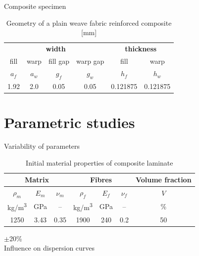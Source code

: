 \documentclass[10pt]{beamer} %
\begin{document}
\begin{frame}[t,label=frame12]{Composite specimen}
\begin{table}[h]
	\renewcommand{\arraystretch}{1.1}
	\centering \footnotesize
	\caption{Geometry of a plain weave fabric reinforced composite [mm]}
	\begin{tabular}{cccccc} 
		\toprule
		\multicolumn{4}{c}{\textbf{width} }	& \multicolumn{2}{c}{\textbf{thickness} }  \\ 
		\cmidrule(lr){1-4} \cmidrule(lr){5-6} 
		fill & warp & fill gap& warp gap& fill & warp\\
		$a_f$ &$a_w$& $g_f$  & $g_w$  & $h_f$& $h_w$ \\ 
		\cmidrule(lr){1-2} \cmidrule(lr){3-4} \cmidrule(lr){5-6}
		1.92 &2.0& 0.05& 0.05 & 0.121875 & 0.121875 \\
		\bottomrule 
	\end{tabular} 
	\label{tab:weave_geo}
\end{table}
\end{frame}


\section{Parametric studies}
\begin{frame}[t,label=frame16]{Variability of parameters}
\begin{table}
	\label{tab:mat_prop}
	\renewcommand{\arraystretch}{1.1}
	\centering \footnotesize
	\caption{Initial material properties of composite laminate}
	\begin{tabular}{ccccccc} 
		\toprule
		\multicolumn{3}{c}{\textbf{Matrix} }	& \multicolumn{3}{c}{\textbf{Fibres} } & \textbf{Volume fraction}	 \\ 
		\midrule
		$\rho_m$ & $E_m$ & $\nu_m$  & $\rho_f$ & $E_f$ & $\nu_f$ & $V$\\
		kg/m\textsuperscript{3} &GPa& --  & kg/m\textsuperscript{3}  & GPa& -- & \%\\ 
		\cmidrule(lr){1-3} \cmidrule(lr){4-6} \cmidrule(lr){7-7}
		1250 &3.43& 0.35& 1900 & 240 & 0.2 & 50\\
		\bottomrule 
	\end{tabular} 
\end{table}
\vspace{10pt}
\centering
\Large $\pm$20\%\\ 
\vspace{10pt}
\normalsize Influence on dispersion curves
\end{frame}
\end{document}
